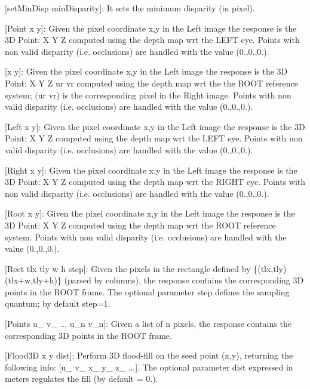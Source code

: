 \begin{DoxyItemize}
\begin{DoxyItemize}
\item \mbox{[}set\+Min\+Disp min\+Disparity\mbox{]}\+: It sets the minimum disparity (in pixel).
\item \mbox{[}Point x y\mbox{]}\+: Given the pixel coordinate x,y in the Left image the response is the 3D Point\+: X Y Z computed using the depth map wrt the L\+E\+FT eye. Points with non valid disparity (i.\+e. occlusions) are handled with the value (0.,0.,0.).
\item \mbox{[}x y\mbox{]}\+: Given the pixel coordinate x,y in the Left image the response is the 3D Point\+: X Y Z ur vr computed using the depth map wrt the the R\+O\+OT reference system; (ur vr) is the corresponding pixel in the Right image. Points with non valid disparity (i.\+e. occlusions) are handled with the value (0.,0.,0.).
\item \mbox{[}Left x y\mbox{]}\+: Given the pixel coordinate x,y in the Left image the response is the 3D Point\+: X Y Z computed using the depth map wrt the L\+E\+FT eye. Points with non valid disparity (i.\+e. occlusions) are handled with the value (0.,0.,0.).
\item \mbox{[}Right x y\mbox{]}\+: Given the pixel coordinate x,y in the Left image the response is the 3D Point\+: X Y Z computed using the depth map wrt the R\+I\+G\+HT eye. Points with non valid disparity (i.\+e. occlusions) are handled with the value (0.,0.,0.).
\item \mbox{[}Root x y\mbox{]}\+: Given the pixel coordinate x,y in the Left image the response is the 3D Point\+: X Y Z computed using the depth map wrt the R\+O\+OT reference system. Points with non valid disparity (i.\+e. occlusions) are handled with the value (0.,0.,0.).
\item \mbox{[}Rect tlx tly w h step\mbox{]}\+: Given the pixels in the rectangle defined by \{(tlx,tly) (tlx+w,tly+h)\} (parsed by columns), the response contains the corresponding 3D points in the R\+O\+OT frame. The optional parameter step defines the sampling quantum; by default step=1.
\item \mbox{[}Points u\+\_ v\+\_ ... u\+\_\+n v\+\_\+n\mbox{]}\+: Given a list of n pixels, the response contains the corresponding 3D points in the R\+O\+OT frame.
\item \mbox{[}Flood3D x y dist\mbox{]}\+: Perform 3D flood-\/fill on the seed point (x,y), returning the following info\+: \mbox{[}u\+\_ v\+\_ x\+\_ y\+\_ z\+\_ ...\mbox{]}. The optional parameter dist expressed in meters regulates the fill (by default = 0.).

\end{DoxyItemize}
\end{DoxyItemize}
